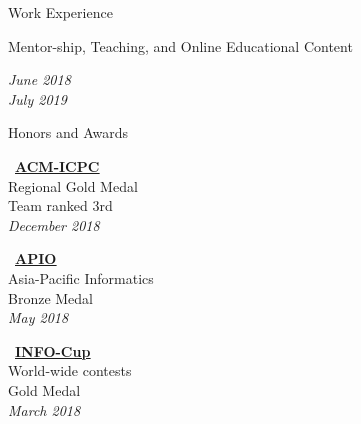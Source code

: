 \documentclass{resume} %
\begin{document}
\begin{rSection}{Work Experience}
\begin{small}
\begin{rSubsection}{Mentor-ship, Teaching, and Online Educational Content}{}{}{}
\parbox{3cm}{\begin{flushright}
\begin{center}
\textcolor{Black!70}{\it June 2018 \\ July 2019}
\end{center}
\end{flushright}}
\end{rSubsection}
\end{small}
\end{rSection}

\begin{rSection}{Honors and Awards}
\begin{footnotesize}
\begin{minipage}[t]{1.6in}
\begin{center}
\vspace{0.2cm}
    \faLink \ \href{http://icpc.sharif.edu/2018/scoreboard/}{\bf \underline{ACM-ICPC}}\\
    Regional Gold Medal\\
    Team ranked 3rd\\
    \textcolor{Black!70}{\it December 2018}
\end{center}
\end{minipage}
\hspace{0.1cm}
\begin{minipage}[t]{1.6in}
\begin{center}
\vspace{0.2cm}
\faLink \ \href{https://apio2018.ru/results/official-contest/}{\bf \underline{APIO}}\\
Asia-Pacific Informatics\\
Bronze Medal \\
\textcolor{Black!70}{\it May 2018}
\end{center}
\end{minipage}
\hspace{0.1cm}
\begin{minipage}[t]{1.6in}
\begin{center}
\vspace{0.2cm}
\faLink \ \href{https://www.info1cup.com/archive/2018/International_Round_Ranking.pdf}{\bf \underline{INFO-Cup}} \\
World-wide contests\\
Gold Medal\\
\textcolor{Black!70}{\it March 2018}
\end{center}
\end{minipage}
\hspace{0.1cm}
\begin{minipage}[t]{1.8in}

\end{minipage}
\end{footnotesize}
\end{rSection}
\end{document}
